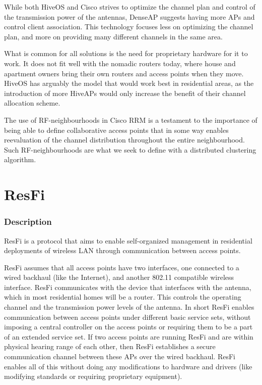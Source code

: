 		While both HiveOS and Cisco strives to optimize the channel plan and control of the transmission power of the antennas, DenseAP suggests having more APs and control client association. This technology focuses less on optimizing the channel plan, and more on providing many different channels in the same area.  

		What is common for all solutions is the need for proprietary hardware for it to work. It does not fit well with the nomadic routers today, where
		house and apartment owners bring their own routers and access points when they move.
		HiveOS has arguably the model that would work best in residential areas, as the introduction of more HiveAPs would only increase the benefit of their channel allocation scheme. 

		The use of RF-neighbourhoods in Cisco RRM is a testament to the importance of being able to define collaborative access points that in some way enables reevaluation of
		the channel distribution throughout the entire neighbourhood. Such RF-neighbourhoods are what we seek to define with a distributed clustering algorithm.

\section{ResFi}
\subsubsection{Description}
ResFi \cite{resfi} is a protocol that aims to enable self-organized management in residential deployments of wireless LAN through communication between access points.

ResFi assumes that all access points have two interfaces, one connected to a wired backhaul (like the Internet), and another
802.11 compatible wireless interface. ResFi communicates with the device that interfaces with the antenna, which in most residential homes will be a router. This controls the operating channel and the transmission power levels of the antenna. In short ResFi enables communication between access points under different basic service sets, without imposing a central controller on the access points or
requiring them to be a part of an extended service set. If two access points are running ResFi and are within physical hearing range of each other, then ResFi 
establishes a secure communication channel between these APs over the wired backhaul. ResFi enables all of this without doing any modifications to hardware and drivers (like modifying standards or requiring proprietary equipment). 

